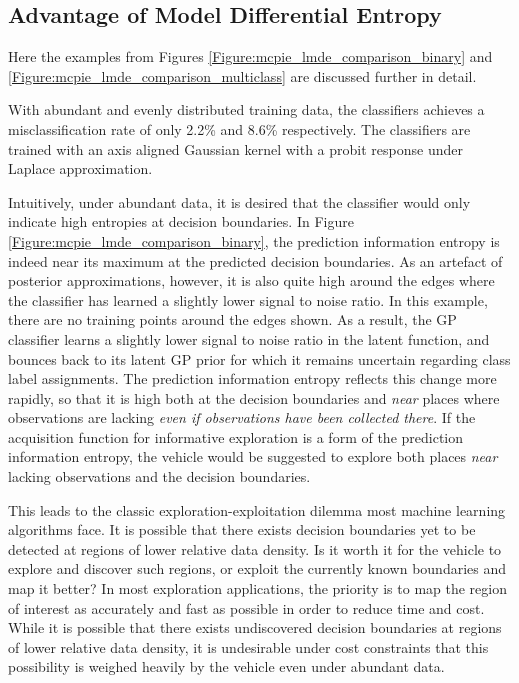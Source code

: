 		\subsection{Advantage of Model Differential Entropy}
		\label{InformativeSeafloorExploration:ComparisonMutualEntropyMeasures:AdvantagesMDE}
		
			Here the examples from Figures \ref{Figure:mcpie_lmde_comparison_binary} and \ref{Figure:mcpie_lmde_comparison_multiclass} are discussed further in detail.
			
			With abundant and evenly distributed training data, the classifiers achieves a misclassification rate of only 2.2\% and 8.6\% respectively. The classifiers are trained with an axis aligned Gaussian kernel with a probit response under Laplace approximation. 
			
			Intuitively, under abundant data, it is desired that the classifier would only indicate high entropies at decision boundaries. In Figure \ref{Figure:mcpie_lmde_comparison_binary}, the prediction information entropy is indeed near its maximum at the predicted decision boundaries. As an artefact of posterior approximations, however, it is also quite high around the edges where the classifier has learned a slightly lower signal to noise ratio. In this example, there are no training points around the edges shown. As a result, the GP classifier learns a slightly lower signal to noise ratio in the latent function, and bounces back to its latent GP prior for which it remains uncertain regarding class label assignments. The prediction information entropy reflects this change more rapidly, so that it is high both at the decision boundaries and \textit{near} places where observations are lacking \textit{even if observations have been collected there}. If the acquisition function for informative exploration is a form of the prediction information entropy, the vehicle would be suggested to explore both places \textit{near} lacking observations and the decision boundaries. 
	
			This leads to the classic exploration-exploitation dilemma most machine learning algorithms face. It is possible that there exists decision boundaries yet to be detected at regions of lower relative data density. Is it worth it for the vehicle to explore and discover such regions, or exploit the currently known boundaries and map it better? In most exploration applications, the priority is to map the region of interest as accurately and fast as possible in order to reduce time and cost. While it is possible that there exists undiscovered decision boundaries at regions of lower relative data density, it is undesirable under cost constraints that this possibility is weighed heavily by the vehicle even under abundant data.
					
